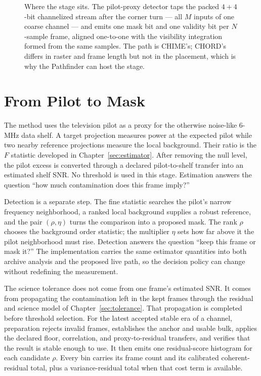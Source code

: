 \begin{figure}[t]
\centering
\resizebox{\linewidth}{!}{}
\caption[Placement of the detector in the shared signal path]{Where the stage sits. The pilot-proxy detector taps the packed $4{+}4$-bit channelized stream after the corner turn --- all $M$ inputs of one coarse channel --- and emits one mask bit and one validity bit per $N$-sample frame, aligned one-to-one with the visibility integration formed from the same samples. The path is CHIME's; CHORD's differs in raster and frame length but not in the placement, which is why the Pathfinder can host the stage.}
\label{fig:system:placement}
\end{figure}

\section{From Pilot to Mask}
\label{sec:system:detector}

The method uses the television pilot as a proxy for the otherwise noise-like 6-MHz data shelf. A target projection measures power at the expected pilot while two nearby reference projections measure the local background. Their ratio is the $F$ statistic developed in Chapter~\ref{sec:estimator}. After removing the null level, the pilot excess is converted through a declared pilot-to-shelf transfer into an estimated shelf SNR. No threshold is used in this stage. Estimation answers the question ``how much contamination does this frame imply?''

Detection is a separate step. The fine statistic searches the pilot's narrow frequency neighborhood, a ranked local background supplies a robust reference, and the pair $(\rho,\eta)$ turns the comparison into a proposed mask. The rank $\rho$ chooses the background order statistic; the multiplier $\eta$ sets how far above it the pilot neighborhood must rise. Detection answers the question ``keep this frame or mask it?'' The implementation carries the same estimator quantities into both archive analysis and the proposed live path, so the decision policy can change without redefining the measurement.

The science tolerance does not come from one frame's estimated SNR. It comes from propagating the contamination left in the kept frames through the residual and science model of Chapter~\ref{sec:tolerance}. That propagation is completed before threshold selection. For the latest accepted stable era of a channel, preparation rejects invalid frames, establishes the anchor and usable bulk, applies the declared floor, correlation, and proxy-to-residual transfers, and verifies that the result is stable enough to use. It then emits one residual-score histogram for each candidate $\rho$. Every bin carries its frame count and its calibrated coherent-residual total, plus a variance-residual total when that cost term is available.

